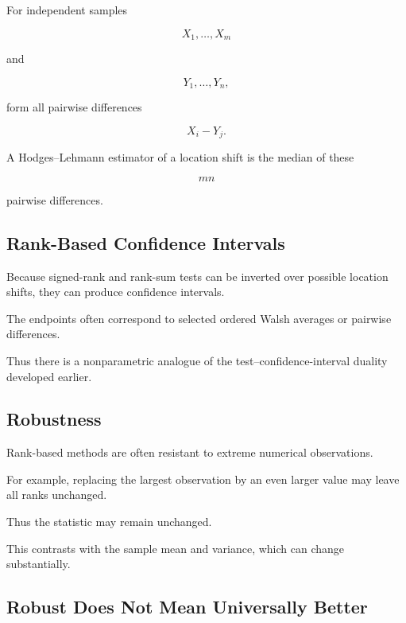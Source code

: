 For independent samples

\[
X_1,\ldots,X_m
\]

and

\[
Y_1,\ldots,Y_n,
\]

form all pairwise differences

\[
\boxed{
X_i-Y_j.
}
\]

A Hodges--Lehmann estimator of a location shift is the median of these

\[
mn
\]

pairwise differences.

\subsection{Rank-Based Confidence Intervals}
\label{subsec:rank-based-confidence-intervals}

Because signed-rank and rank-sum tests can be inverted over possible
location shifts, they can produce confidence intervals.

The endpoints often correspond to selected ordered Walsh averages or
pairwise differences.

Thus there is a nonparametric analogue of the test--confidence-interval
duality developed earlier.

\subsection{Robustness}
\label{subsec:nonparametric-robustness}

Rank-based methods are often resistant to extreme numerical observations.

For example, replacing the largest observation by an even larger value
may leave all ranks unchanged.

Thus the statistic may remain unchanged.

This contrasts with the sample mean and variance, which can change
substantially.

\subsection{Robust Does Not Mean Universally Better}
\label{subsec:robust-not-universal}

